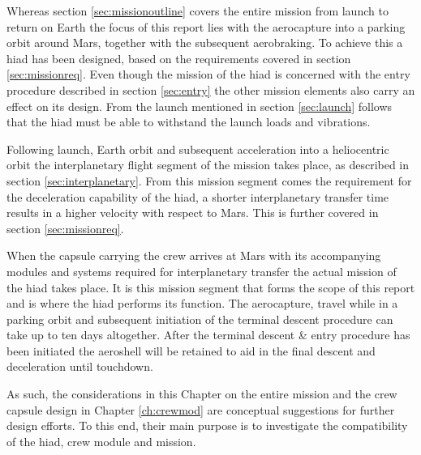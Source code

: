 Whereas section \ref{sec:missionoutline} covers the entire mission from launch to return on Earth the focus of this report lies with the aerocapture into a parking orbit around Mars, together with the subsequent aerobraking. To achieve this a \gls{hiad} has been designed, based on the requirements covered in section \ref{sec:missionreq}. Even though the mission of the \gls{hiad} is concerned with the entry procedure described in section \ref{sec:entry} the other mission elements also carry an effect on its design. From the launch mentioned in section \ref{sec:launch} follows that the \gls{hiad} must be able to withstand the launch loads and vibrations. 

Following launch, Earth orbit and subsequent acceleration into a heliocentric orbit the interplanetary flight segment of the mission takes place, as described in section \ref{sec:interplanetary}. From this mission segment comes the requirement for the deceleration capability of the \gls{hiad}, a shorter interplanetary transfer time results in a higher velocity with respect to Mars. This is further covered in section \ref{sec:missionreq}. 

When the capsule carrying the crew arrives at Mars with its accompanying modules and systems required for interplanetary transfer the actual mission of the \gls{hiad} takes place. It is this mission segment that forms the scope of this report and is where the \gls{hiad} performs its function. The aerocapture, travel while in a parking orbit and subsequent initiation of the terminal descent procedure can take up to ten days altogether. After the terminal descent \& entry procedure has been initiated the aeroshell will be retained to aid in the final descent and deceleration until touchdown.

As such, the considerations in this Chapter on the entire mission and the crew capsule design in Chapter \ref{ch:crewmod} are conceptual suggestions for further design efforts. To this end, their main purpose is to investigate the compatibility of the \gls{hiad}, crew module and mission.